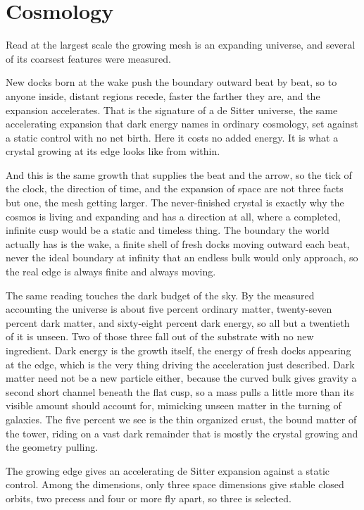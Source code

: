 \section{Cosmology}

Read at the largest scale the growing mesh is an expanding universe, and several of its coarsest features were measured. \cite{pollard2026vibetest}

New docks born at the wake push the boundary outward beat by beat, so to anyone inside, distant regions recede, faster the farther they are, and the expansion accelerates. That is the signature of a de Sitter universe, the same accelerating expansion that dark energy names in ordinary cosmology, set against a static control with no net birth. Here it costs no added energy. It is what a crystal growing at its edge looks like from within.

And this is the same growth that supplies the beat and the arrow, so the tick of the clock, the direction of time, and the expansion of space are not three facts but one, the mesh getting larger. The never-finished crystal is exactly why the cosmos is living and expanding and has a direction at all, where a completed, infinite cusp would be a static and timeless thing. The boundary the world actually has is the wake, a finite shell of fresh docks moving outward each beat, never the ideal boundary at infinity that an endless bulk would only approach, so the real edge is always finite and always moving.

The same reading touches the dark budget of the sky. By the measured accounting the universe is about five percent ordinary matter, twenty-seven percent dark matter, and sixty-eight percent dark energy, so all but a twentieth of it is unseen. Two of those three fall out of the substrate with no new ingredient. Dark energy is the growth itself, the energy of fresh docks appearing at the edge, which is the very thing driving the acceleration just described. Dark matter need not be a new particle either, because the curved bulk gives gravity a second short channel beneath the flat cusp, so a mass pulls a little more than its visible amount should account for, mimicking unseen matter in the turning of galaxies. The five percent we see is the thin organized crust, the bound matter of the tower, riding on a vast dark remainder that is mostly the crystal growing and the geometry pulling.

\begin{result}
The growing edge gives an accelerating de Sitter expansion against a static control. Among the dimensions, only three space dimensions give stable closed orbits, two precess and four or more fly apart, so three is selected. \cite{pollard2026vibetest}
\end{result}

